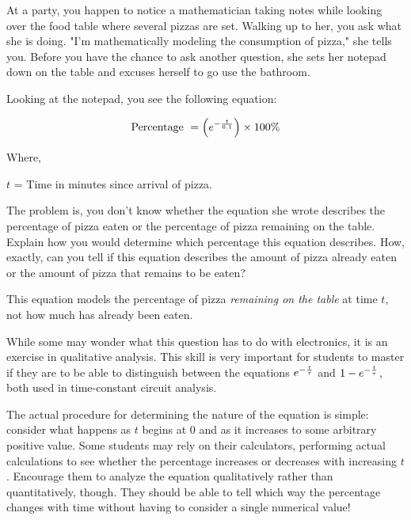 

At a party, you happen to notice a mathematician taking notes while looking over the food table where several pizzas are set.  Walking up to her, you ask what she is doing.  "I'm mathematically modeling the consumption of pizza," she tells you.  Before you have the chance to ask another question, she sets her notepad down on the table and excuses herself to go use the bathroom.

Looking at the notepad, you see the following equation:

$$\hbox{Percentage } = \left(e^{-{t \over 6.1}}\right) \times 100\%$$

\noindent
Where,

$t$ = Time in minutes since arrival of pizza.

\vskip 10pt

The problem is, you don't know whether the equation she wrote describes the percentage of pizza eaten or the percentage of pizza remaining on the table.  Explain how you would determine which percentage this equation describes.  How, exactly, can you tell if this equation describes the amount of pizza already eaten or the amount of pizza that remains to be eaten?







This equation models the percentage of pizza {\it remaining on the table} at time $t$, not how much has already been eaten.







While some may wonder what this question has to do with electronics, it is an exercise in qualitative analysis.  This skill is very important for students to master if they are to be able to distinguish between the equations $e^{-{t \over \tau}}$ and $1 - e^{-{t \over \tau}}$, both used in time-constant circuit analysis.

The actual procedure for determining the nature of the equation is simple: consider what happens as $t$ begins at 0 and as it increases to some arbitrary positive value.  Some students may rely on their calculators, performing actual calculations to see whether the percentage increases or decreases with increasing $t$.  Encourage them to analyze the equation qualitatively rather than quantitatively, though.  They should be able to tell which way the percentage changes with time without having to consider a single numerical value!




